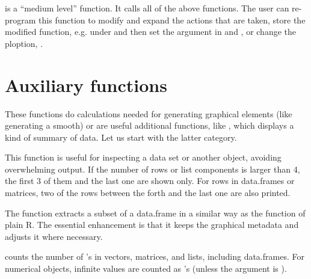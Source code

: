 \documentclass[11pt]{article}\usepackage[]{graphicx}\usepackage[]{color}
\begin{document}
 is a ``medium level'' function. It calls all of the above
  functions.
  The user can re-program this function to modify and expand the actions that
  are taken, store the modified function, e.g. under 
  and then set %
  the argument  in  and ,
  or change the ploption, .


\section{Auxiliary functions}
These functions do calculations needed for generating graphical elements
(like generating a smooth) or are useful additional functions,
like , which displays a kind of summary of data.
Let us start with the latter category.

This function is useful for inspecting a data set or another object, 
avoiding overwhelming output. 
If the number of rows or list components is larger than 4,
the first 3 of them and the last one are shown only.
For rows in data.frames or matrices, two of the rows between the forth and
the last one are also printed.

The function  extracts a subset of a data.frame in a similar way
as the  function of plain R.
The essential enhancement is that it keeps the graphical metadata and 
adjusts it where necessary.


 counts the number of 's in vectors, matrices, and lists, 
including data.frames. 
For numerical objects, infinite values are counted as 's 
(unless the argument  is ).
\end{document}
